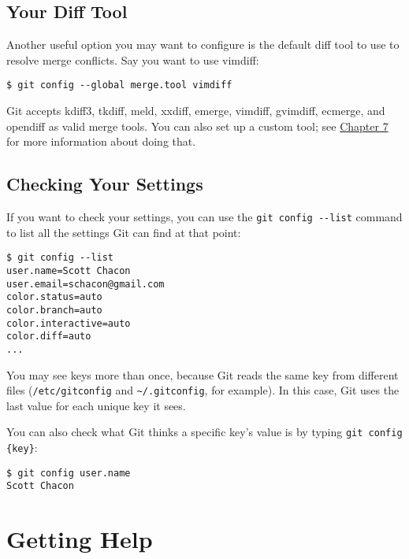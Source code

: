 \documentclass[a4paper]{book}
\newcommand{\prechap}{Chapter }
\newcommand{\postchap}{}
\newcommand{\chapref}[1]{\hyperref[chap:#1]{\prechap #1\postchap}}
\begin{document}
\subsection{Your Diff Tool}\label{your-diff-tool}

Another useful option you may want to configure is the default diff tool to use to resolve merge conflicts. Say you want to use vimdiff:

\begin{shaded}\begin{verbatim}
$ git config --global merge.tool vimdiff
\end{verbatim}\end{shaded}

Git accepts kdiff3, tkdiff, meld, xxdiff, emerge, vimdiff, gvimdiff, ecmerge, and opendiff as valid merge tools. You can also set up a custom tool; see \chapref{7} for more information about doing that.

\subsection{Checking Your Settings}\label{checking-your-settings}

If you want to check your settings, you can use the \texttt{git config -{}-list} command to list all the settings Git can find at that point:

\begin{shaded}\begin{verbatim}
$ git config --list
user.name=Scott Chacon
user.email=schacon@gmail.com
color.status=auto
color.branch=auto
color.interactive=auto
color.diff=auto
...
\end{verbatim}\end{shaded}

You may see keys more than once, because Git reads the same key from different files (\texttt{/etc/gitconfig} and \texttt{\textasciitilde{}/.gitconfig}, for example). In this case, Git uses the last value for each unique key it sees.

You can also check what Git thinks a specific key's value is by typing \texttt{git config \{key\}}:

\begin{shaded}\begin{verbatim}
$ git config user.name
Scott Chacon
\end{verbatim}\end{shaded}

\section{Getting Help}\label{getting-help}
\end{document}

